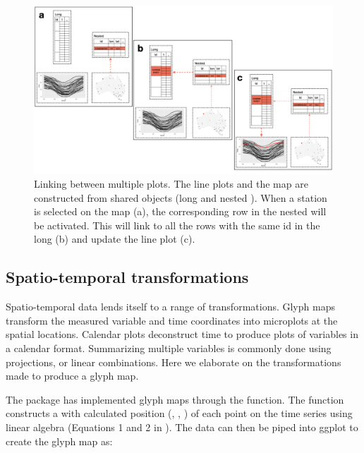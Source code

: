 \documentclass[
  shortnames]{jss}
\begin{document}
\begin{CodeChunk}
\begin{figure}

{\centering \includegraphics[width=1\linewidth,height=0.35\textheight]{../figures/diagram-keynotes/diagram-keynotes.004} 

}

\caption{Linking between multiple plots. The line plots and the map are constructed from shared  objects (long and nested ). When a station is selected on the map (a), the corresponding row in the nested  will be activated. This will link to all the rows with the same id in the long  (b) and update the line plot (c).}\label{fig:illu-interactive}
\end{figure}
\end{CodeChunk}

\hypertarget{st_transformation}{%
\subsection{Spatio-temporal transformations}\label{st_transformation}}

Spatio-temporal data lends itself to a range of transformations. Glyph maps \citep{Wickham2012-yr} transform the measured variable and time coordinates into microplots at the spatial locations. Calendar plots \citep{wang2020calendar} deconstruct time to produce plots of variables in a calendar format. Summarizing multiple variables is commonly done using projections, or linear combinations. Here we elaborate on the transformations made to produce a glyph map.

The package  \citep{ggally} has implemented glyph maps through the  function. The function constructs a  with calculated position (, , ) of each point on the time series using linear algebra (Equations 1 and 2 in \citet{Wickham2012-yr}). The data can then be piped into ggplot to create the glyph map as:
\end{document}
